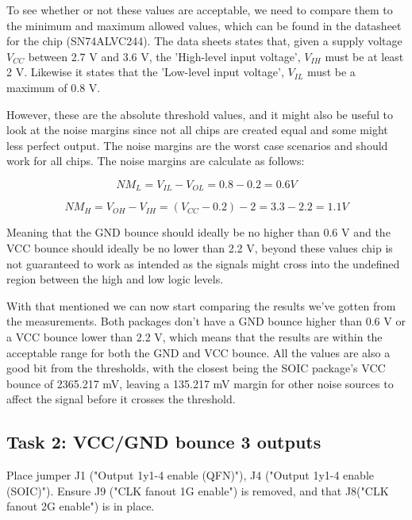 \documentclass[../main.tex]{subfiles}
\begin{document}
To see whether or not these values are acceptable, we need to compare them to the minimum and maximum allowed values, which can be found in the datasheet for the chip (SN74ALVC244). The data sheets states that, given a supply voltage $V_{CC}$ between 2.7 V and 3.6 V, the 'High-level input voltage', $V_{IH}$ must be at least 2 V. Likewise it states that the 'Low-level input voltage', $V_{IL}$ must be a maximum of 0.8 V. 

However, these are the absolute threshold values, and it might also be useful to look at the noise margins since not all chips are created equal and some might less perfect output. The noise margins are the worst case scenarios and should work for all chips. The noise margins are calculate as follows:

\begin{equation*}
    NM_{L} = V_{IL} - V_{OL} = 0.8 - 0.2 = 0.6 V
\end{equation*}

\begin{equation*}
    NM_{H} = V_{OH} - V_{IH} = (V_{CC} - 0.2) - 2 = 3.3 - 2.2 = 1.1 V
\end{equation*}

Meaning that the GND bounce should ideally be no higher than 0.6 V and the VCC bounce should ideally be no lower than 2.2 V, beyond these values chip is not guaranteed to work as intended as the signals might cross into the undefined region between the high and low logic levels.

\vspace{10pt}

With that mentioned we can now start comparing the results we've gotten from the measurements. Both packages don't have a GND bounce higher than 0.6 V or a VCC bounce lower than 2.2 V, which means that the results are within the acceptable range for both the GND and VCC bounce. All the values are also a good bit from the thresholds, with the closest being the SOIC package's VCC bounce of 2365.217 mV, leaving a 135.217 mV margin for other noise sources to affect the signal before it crosses the threshold.

\subsection{Task 2: VCC/GND bounce 3 outputs}

Place jumper J1 ("Output 1y1-4 enable (QFN)"), J4 ("Output 1y1-4 enable (SOIC)"). Ensure J9 ("CLK fanout 1G enable") is removed, and that J8("CLK fanout 2G enable") is in place.
\end{document}
